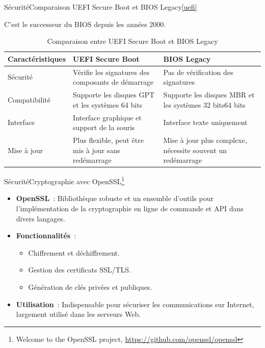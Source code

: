 \documentclass{beamer}
\begin{document}
    \begin{frame}{Sécurité}{Comparaison UEFI Secure Boot et BIOS Legacy\cref{uefi}}
        \begin{footnotesize}
            C'est le successeur du BIOS depuis les années 2000.
            \begin{table}[h!]
                \centering
                \begin{tabular}{|p{2cm}|p{4cm}|p{4cm}|}
                    \hline
                    \textbf{Caractéristiques} & \textbf{UEFI Secure Boot}                            & \textbf{BIOS Legacy}                                        \\
                    \hline
                    Sécurité                  & Vérifie les signatures des composants de démarrage   & Pas de vérification des signatures                          \\
                    \hline
                    Compatibilité             & Supporte les disques GPT et les systèmes 64 bits     & Supporte les disques MBR et les systèmes 32 bits\/64 bits   \\
                    \hline
                    Interface                 & Interface graphique et support de la souris          & Interface texte uniquement                                  \\
                    \hline
                    Mise à jour               & Plus flexible, peut être mis à jour sans redémarrage & Mise à jour plus complexe, nécessite souvent un redémarrage \\
                    \hline
                \end{tabular}
                \caption{Comparaison entre UEFI Secure Boot et BIOS Legacy}
            \end{table}
        \end{footnotesize}
    \end{frame}

    \begin{frame}{Sécurité}{Cryptographie avec OpenSSL\footnote{Welcome to the OpenSSL project, \url{https://github.com/openssl/openssl}}}
        \begin{itemize}
            \item \textbf{OpenSSL}~: Bibliothèque robuste et un ensemble d'outils pour l'implémentation de la cryptographie en ligne de commande et API dans divers langages.
            \item \textbf{Fonctionnalités}~:
            \begin{itemize}
                \item Chiffrement et déchiffrement.
                \item Gestion des certificats SSL/TLS.
                \item Génération de clés privées et publiques.
            \end{itemize}
            \item \textbf{Utilisation}~: Indispensable pour sécuriser les communications sur Internet, largement utilisé dans les serveurs Web.
        \end{itemize}
    \end{frame}
\end{document}
